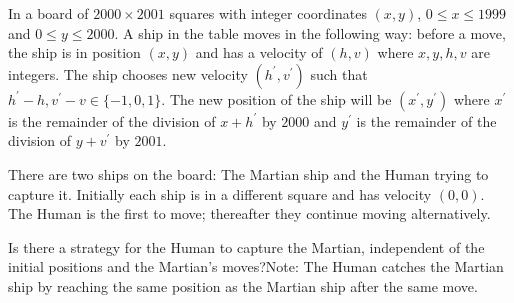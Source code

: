 In a board of $2000\times2001$ squares with integer coordinates $(x,y)$,  $0\leq{x}\leq1999$ and $0\leq{y}\leq2000$. A ship in the table moves in the following way: before a move, the ship is in position $(x,y)$ and has a velocity of $(h,v)$ where $x,y,h,v$ are integers. The ship chooses new velocity $(h^\prime,v^\prime)$ such that $h^\prime-h,v^\prime-v\in\{-1,0,1\}$. The new position of the ship will be $(x^\prime,y^\prime)$ where $x^\prime$ is the remainder of the division of $x+h^\prime$ by $2000$ and $y^\prime$ is the remainder of the division of $y+v^\prime$ by $2001$.

There are two ships on the board: The Martian ship and the Human trying to capture it. Initially each ship is in a different square and has velocity $(0,0)$. The Human is the first to move; thereafter they continue moving alternatively.

Is there a strategy for the Human to capture the Martian, independent of the initial positions and the Martian’s moves?Note: The Human catches the Martian ship by reaching the same position as the Martian ship after the same move.